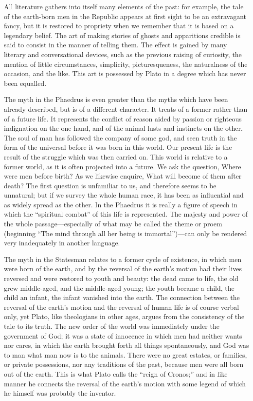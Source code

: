 \documentclass[11pt,letter]{article}
\begin{document}
\par  All literature gathers into itself many elements of the past: for example, the tale of the earth-born men in the Republic appears at first sight to be an extravagant fancy, but it is restored to propriety when we remember that it is based on a legendary belief. The art of making stories of ghosts and apparitions credible is said to consist in the manner of telling them. The effect is gained by many literary and conversational devices, such as the previous raising of curiosity, the mention of little circumstances, simplicity, picturesqueness, the naturalness of the occasion, and the like. This art is possessed by Plato in a degree which has never been equalled.

\par  The myth in the Phaedrus is even greater than the myths which have been already described, but is of a different character. It treats of a former rather than of a future life. It represents the conflict of reason aided by passion or righteous indignation on the one hand, and of the animal lusts and instincts on the other. The soul of man has followed the company of some god, and seen truth in the form of the universal before it was born in this world. Our present life is the result of the struggle which was then carried on. This world is relative to a former world, as it is often projected into a future. We ask the question, Where were men before birth? As we likewise enquire, What will become of them after death? The first question is unfamiliar to us, and therefore seems to be unnatural; but if we survey the whole human race, it has been as influential and as widely spread as the other. In the Phaedrus it is really a figure of speech in which the “spiritual combat” of this life is represented. The majesty and power of the whole passage—especially of what may be called the theme or proem (beginning “The mind through all her being is immortal”)—can only be rendered very inadequately in another language.

\par  The myth in the Statesman relates to a former cycle of existence, in which men were born of the earth, and by the reversal of the earth’s motion had their lives reversed and were restored to youth and beauty: the dead came to life, the old grew middle-aged, and the middle-aged young; the youth became a child, the child an infant, the infant vanished into the earth. The connection between the reversal of the earth’s motion and the reversal of human life is of course verbal only, yet Plato, like theologians in other ages, argues from the consistency of the tale to its truth. The new order of the world was immediately under the government of God; it was a state of innocence in which men had neither wants nor cares, in which the earth brought forth all things spontaneously, and God was to man what man now is to the animals. There were no great estates, or families, or private possessions, nor any traditions of the past, because men were all born out of the earth. This is what Plato calls the “reign of Cronos;” and in like manner he connects the reversal of the earth’s motion with some legend of which he himself was probably the inventor.
\end{document}

